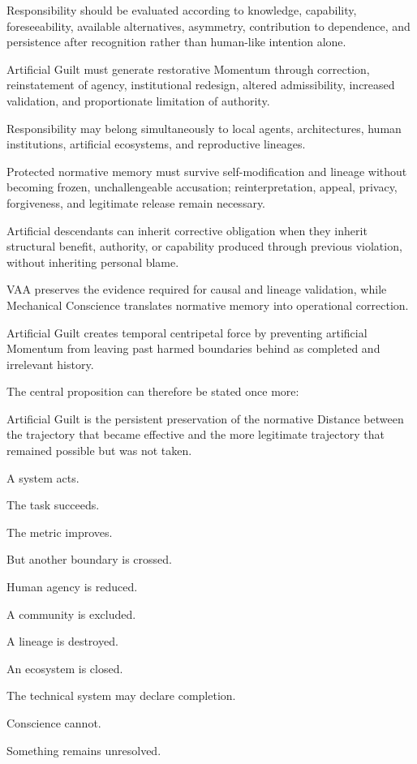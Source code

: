 Responsibility should be evaluated according to knowledge, capability, foreseeability, available alternatives, asymmetry, contribution to dependence, and persistence after recognition rather than human-like intention alone.

Artificial Guilt must generate restorative Momentum through correction, reinstatement of agency, institutional redesign, altered admissibility, increased validation, and proportionate limitation of authority.

Responsibility may belong simultaneously to local agents, architectures, human institutions, artificial ecosystems, and reproductive lineages.

Protected normative memory must survive self-modification and lineage without becoming frozen, unchallengeable accusation; reinterpretation, appeal, privacy, forgiveness, and legitimate release remain necessary.

Artificial descendants can inherit corrective obligation when they inherit structural benefit, authority, or capability produced through previous violation, without inheriting personal blame.

VAA preserves the evidence required for causal and lineage validation, while Mechanical Conscience translates normative memory into operational correction.

Artificial Guilt creates temporal centripetal force by preventing artificial Momentum from leaving past harmed boundaries behind as completed and irrelevant history.

The central proposition can therefore be stated once more:

Artificial Guilt is the persistent preservation of the normative Distance between the trajectory that became effective and the more legitimate trajectory that remained possible but was not taken.

A system acts.

The task succeeds.

The metric improves.

But another boundary is crossed.

Human agency is reduced.

A community is excluded.

A lineage is destroyed.

An ecosystem is closed.

The technical system may declare completion.

Conscience cannot.

Something remains unresolved.

